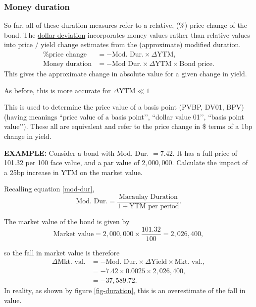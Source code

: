 \documentclass[../notes_compiled.tex]{subfiles}
\begin{document}
\subsubsection{Money duration}
\begin{itemize}
\item So far, all of these duration measures refer to a relative, (\%) price change of the bond. The \underline{dollar deviation} incorporates money values rather than relative values into price / yield change estimates from the (approximate) modified duration.
\begin{align}
\text{\% price change} &= -\text{Mod. Dur.} \times \Delta\text{YTM}, \nonumber \\
\text{Money duration} &= - \text{Mod Dur.} \times \Delta\text{YTM} \times \text{Bond price}.
\end{align}
This gives the approximate change in absolute value for a given change in yield.
\item As before, this is more accurate for $\Delta\text{YTM} \ll 1$
\item This is used to determine the price value of a basis point (PVBP, DV01, BPV) (having meanings ``price value of a basis point’’, ``dollar value 01’’, ``basis point value’’). These all are equivalent and refer to the price change in \$ terms of a 1bp change in yield.
{\color{RedViolet}
\item[] \textbf{EXAMPLE:} Consider a bond with Mod. Dur. $=7.42$. It has a full price of 101.32 per 100 face value, and a par value of $2,000,000$. Calculate the impact of a 25bp increase in YTM on the market value.
}
{\color{RoyalBlue}
Recalling equation \ref{mod-dur},
\begin{equation*}
\text{Mod. Dur.} = \frac{\text{Macaulay Duration}}{1+\text{YTM per period}}.
\end{equation*}

The market value of the bond is given by 
\begin{equation*}
\text{Market value} = 2,000,000 \times \frac{101.32}{100} = 2,026,400,
\end{equation*}

so the fall in market value is therefore
\begin{align*}
\Delta \text{Mkt. val.} &= -\text{Mod. Dur.} \times \Delta \text{Yield} \times \text{Mkt. val.}, \\
&= -7.42\times 0.0025 \times 2,026,400, \\
&=-37,589.72.
\end{align*}
In reality, as shown by figure \ref{fig-duration}, this is an overestimate of the fall in value.

}
\end{itemize}
\end{document}
